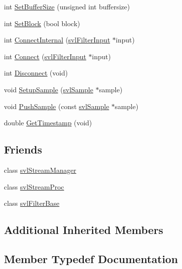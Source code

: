 \begin{DoxyCompactItemize}
\item 
int \hyperlink{classsvl_filter_output_acead42898ed4d883f3e5fa61e4b98e05}{Set\+Buffer\+Size} (unsigned int buffersize)
\item 
int \hyperlink{classsvl_filter_output_a0eb7c5b01a575deca2384483cd503e5e}{Set\+Block} (bool block)
\item 
int \hyperlink{classsvl_filter_output_ab9bf0a164e2d579b50cdb4547b53a6b1}{Connect\+Internal} (\hyperlink{classsvl_filter_input}{svl\+Filter\+Input} $\ast$input)
\item 
int \hyperlink{classsvl_filter_output_a488e5d64ab5b37afbe18b3e8214eb637}{Connect} (\hyperlink{classsvl_filter_input}{svl\+Filter\+Input} $\ast$input)
\item 
int \hyperlink{classsvl_filter_output_a4b18fc71114c7bb8344f9d66b0d63b95}{Disconnect} (void)
\item 
void \hyperlink{classsvl_filter_output_a4e522260ab6e2772ebc8f767897f681a}{Setup\+Sample} (\hyperlink{classsvl_sample}{svl\+Sample} $\ast$sample)
\item 
void \hyperlink{classsvl_filter_output_a4e1baef6ee205cf01fd17b5aa5686849}{Push\+Sample} (const \hyperlink{classsvl_sample}{svl\+Sample} $\ast$sample)
\item 
double \hyperlink{classsvl_filter_output_a20525e4791106e6a9e2d5a9f9a5e982d}{Get\+Timestamp} (void)
\end{DoxyCompactItemize}
\subsection*{Friends}
\begin{DoxyCompactItemize}
\item 
class \hyperlink{classsvl_filter_output_ab5eee58544f2ce644140e932afbe32db}{svl\+Stream\+Manager}
\item 
class \hyperlink{classsvl_filter_output_a6a9ee1dec5ca263793dca09411295245}{svl\+Stream\+Proc}
\item 
class \hyperlink{classsvl_filter_output_aadcba5e897486de2d761520b866f4ac0}{svl\+Filter\+Base}
\end{DoxyCompactItemize}
\subsection*{Additional Inherited Members}


\subsection{Member Typedef Documentation}
\hypertarget{classsvl_filter_output_ac8dd607dba96f25d0ae0c249e293d04f}{}
